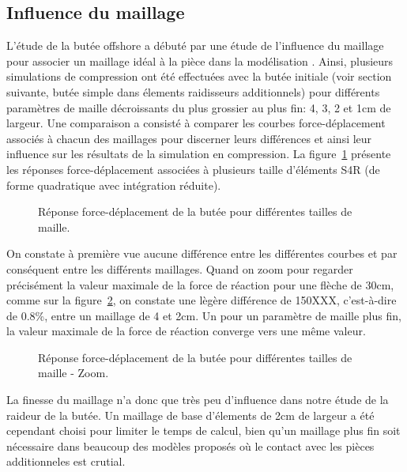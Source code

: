 ﻿\documentclass{article}
\newcommand{\abaqus}{\bsc{Abaqus}\xspace}
\begin{document}
\subsection{Influence du maillage}

L'étude de la butée offshore a débuté par une étude de l'influence du maillage pour associer un maillage idéal à la pièce dans la modélisation \abaqus. Ainsi, plusieurs simulations de compression ont été effectuées avec la butée initiale (voir section suivante, butée simple dans élements raidisseurs additionnels) pour différents paramètres de maille décroissants du plus grossier au plus fin: 4, 3, 2 et 1cm de largeur.
Une comparaison a consisté à comparer les courbes force-déplacement associés à chacun des maillages pour discerner leurs différences et ainsi leur influence sur les résultats de la simulation en compression. La figure~\ref{fig1} présente les réponses force-déplacement associées à plusieurs taille d'éléments S4R (de forme quadratique avec intégration réduite).

\begin{figure}[!h]
	\centering
	\caption{Réponse force-déplacement de la butée pour différentes tailles de maille.}
	\label{fig1}
\end{figure}


On constate à première vue aucune différence entre les différentes courbes et par conséquent entre les différents maillages. Quand on zoom pour regarder précisément la valeur maximale de la force de réaction pour une flèche de 30cm, comme sur la figure~\ref{fig2}, on constate une lègère différence de 150XXX, c'est-à-dire de 0.8\%, entre un maillage de 4 et 2cm. Un pour un paramètre de maille plus fin, la valeur maximale de la force de réaction converge vers une même valeur.

\begin{figure}[!h]
	\centering
	\caption{Réponse force-déplacement de la butée pour différentes tailles de maille - Zoom.}
	\label{fig2}
\end{figure}

La finesse du maillage n'a donc que très peu d'influence dans notre étude de la raideur de la butée. Un maillage de base d'élements de 2cm de largeur a été cependant choisi pour limiter le temps de calcul, bien qu'un maillage plus fin soit nécessaire dans beaucoup des modèles proposés où le contact avec les pièces additionneles est crutial.
\end{document}
